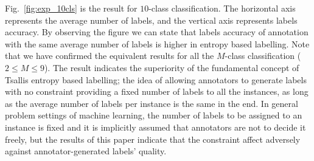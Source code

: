 \documentclass[a4paper,conference]{IEEEtran}
\begin{document}
Fig.~\ref{fig:exp_10cls} is the result for $10$-class classification.
The horizontal axis represents the average number of labels, and the vertical axis represents labels accuracy.
By observing the figure we can state that labels accuracy of annotation with the same average number of labels is higher in entropy based labelling.
Note that we have confirmed the equivalent results for all the $M$-class classification ($2 \le M \le 9$). 
The result indicates the superiority of the fundamental concept of Tsallis entropy based labelling; the idea of allowing annotators to generate labels with no constraint providing a fixed number of labels to all the instances, as long as the average number of labels per instance is the same in the end.
In general problem settings of machine learning, the number of labels to be assigned to an instance is fixed and it is implicitly assumed that annotators are not to decide it freely, but the results of this paper indicate that the constraint affect adversely against annotator-generated labels' quality.
\end{document}
